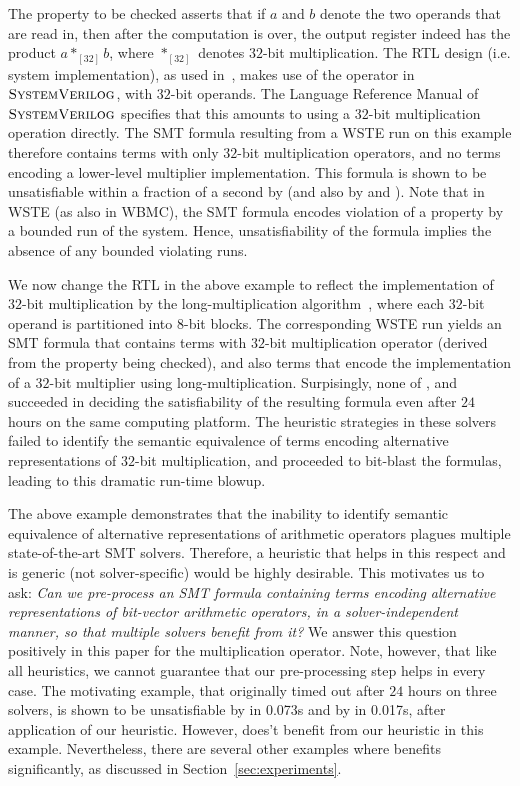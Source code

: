 The property to be checked asserts that if $a$ and $b$ denote the two
operands that are read in, then after the computation is over, the
output register indeed has the product $a *_{[32]} b$, where
$*_{[32]}$ denotes $32$-bit multiplication.  The RTL design
(i.e. system implementation), as used in~\cite{wste}, makes use of the
{\tt *} operator in $\textsc{SystemVerilog}$, with $32$-bit operands.  The Language
Reference Manual of $\textsc{SystemVerilog}$ specifies that this amounts to using a
$32$-bit multiplication operation directly.  The SMT formula resulting
from a WSTE run on this example therefore contains terms with only
$32$-bit multiplication operators, and no terms encoding a lower-level
multiplier implementation.  This formula is shown to be unsatisfiable
within a fraction of a second by {\boolector} (and also by {\cvcfour}
and {\zthree}).  Note that in WSTE (as also in WBMC), the SMT formula
encodes violation of a property by a bounded run of the system. Hence,
unsatisfiability of the formula implies the absence of any bounded
violating runs.

We now change the RTL in the above example to reflect the
implementation of $32$-bit multiplication by the long-multiplication
algorithm~\cite{long}, where each $32$-bit operand is partitioned into
$8$-bit blocks.  The corresponding WSTE run yields an SMT formula that
contains terms with $32$-bit multiplication operator (derived from the
property being checked), and also terms that encode the implementation
of a $32$-bit multiplier using long-multiplication.  Surpisingly, none
of {\boolector}, {\cvcfour} and {\zthree} succeeded in deciding the
satisfiability of the resulting formula even after $24$ hours on the
same computing platform.  The heuristic strategies in these solvers
failed to identify the semantic equivalence of terms encoding
alternative representations of $32$-bit multiplication, and proceeded
to bit-blast the formulas, leading to this dramatic run-time blowup.

The above example demonstrates that the inability to identify semantic
equivalence of alternative representations of arithmetic operators
plagues multiple state-of-the-art SMT solvers.  Therefore, a heuristic
that helps in this respect and is generic (not solver-specific) would
be highly desirable.  This motivates us to ask: \emph{Can we
pre-process an SMT formula containing terms encoding alternative
representations of bit-vector arithmetic operators, in a
solver-independent manner, so that multiple solvers benefit from it?}
We answer this question positively in this paper for the
multiplication operator.  Note, however, that like all heuristics, we
cannot guarantee that our pre-processing step helps in every case.
The motivating example, that originally timed out after $24$ hours on
three solvers, is shown to be unsatisfiable by {\zthree} in 0.073s and
by {\cvcfour} in 0.017s, after application of our heuristic. However,
{\boolector} does't benefit from our heuristic in this example.
Nevertheless, there are several other examples where {\boolector}
benefits significantly, as discussed in Section~\ref{sec:experiments}.

